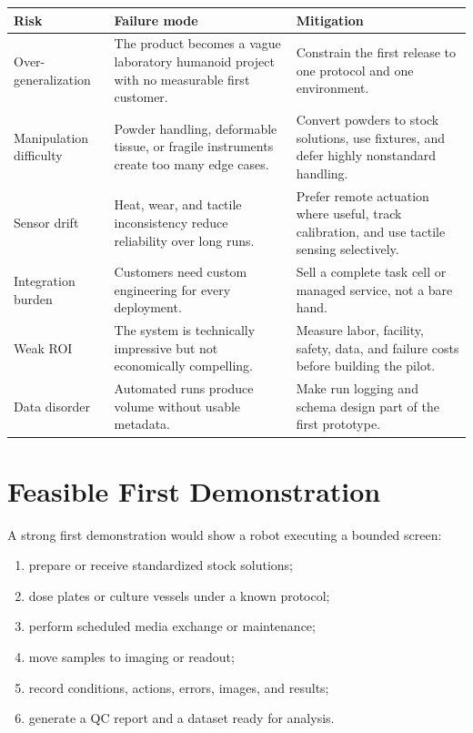 \documentclass[11pt]{article}
\begin{document}
\begin{tabularx}{\linewidth}{@{}p{3.1cm}YY@{}}
\toprule
\textbf{Risk} & \textbf{Failure mode} & \textbf{Mitigation} \\
\midrule
Over-generalization & The product becomes a vague laboratory humanoid project with no measurable first customer. & Constrain the first release to one protocol and one environment. \\
Manipulation difficulty & Powder handling, deformable tissue, or fragile instruments create too many edge cases. & Convert powders to stock solutions, use fixtures, and defer highly nonstandard handling. \\
Sensor drift & Heat, wear, and tactile inconsistency reduce reliability over long runs. & Prefer remote actuation where useful, track calibration, and use tactile sensing selectively. \\
Integration burden & Customers need custom engineering for every deployment. & Sell a complete task cell or managed service, not a bare hand. \\
Weak ROI & The system is technically impressive but not economically compelling. & Measure labor, facility, safety, data, and failure costs before building the pilot. \\
Data disorder & Automated runs produce volume without usable metadata. & Make run logging and schema design part of the first prototype. \\
\bottomrule
\end{tabularx}

\section{Feasible First Demonstration}

A strong first demonstration would show a robot executing a bounded screen:

\begin{enumerate}
  \item prepare or receive standardized stock solutions;
  \item dose plates or culture vessels under a known protocol;
  \item perform scheduled media exchange or maintenance;
  \item move samples to imaging or readout;
  \item record conditions, actions, errors, images, and results;
  \item generate a QC report and a dataset ready for analysis.
\end{enumerate}
\end{document}
